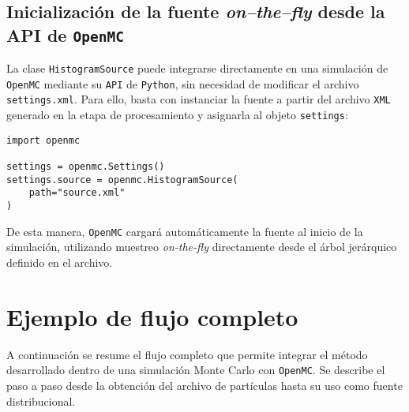 \subsection{Inicialización de la fuente \textit{on–the–fly} desde la API de \texttt{OpenMC}}\label{subsec:openmc_input}

La clase \texttt{HistogramSource} puede integrarse directamente en una simulación de \texttt{OpenMC} mediante su \texttt{API} de \texttt{Python}, sin necesidad de modificar el archivo \texttt{settings.xml}. Para ello, basta con instanciar la fuente a partir del archivo \texttt{XML} generado en la etapa de procesamiento y asignarla al objeto \texttt{settings}:

\begin{verbatim}
import openmc

settings = openmc.Settings()
settings.source = openmc.HistogramSource(
    path="source.xml"
)
\end{verbatim}

\noindent
De esta manera, \texttt{OpenMC} cargará automáticamente la fuente al inicio de la simulación, utilizando muestreo \textit{on-the-fly} directamente desde el árbol jerárquico definido en el archivo.


\section{Ejemplo de flujo completo}\label{sec:ejemplo_flujo}

A continuación se resume el flujo completo que permite integrar el método desarrollado dentro de una simulación Monte Carlo con \texttt{OpenMC}. Se describe el paso a paso desde la obtención del archivo de partículas hasta su uso como fuente distribucional.

